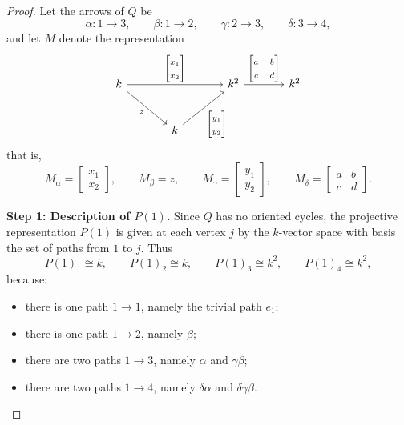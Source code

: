 \documentclass[11pt, a4paper]{article}
\begin{document}
\begin{enumerate}[leftmargin=*, label=\textbf{\arabic*.}]
\begin{proof}
    Let the arrows of \(Q\) be
    \[
    \alpha\colon 1\to 3,\qquad
    \beta\colon 1\to 2,\qquad
    \gamma\colon 2\to 3,\qquad
    \delta\colon 3\to 4,
    \]
    and let \(M\) denote the representation
    \[
    \begin{tikzcd}[ampersand replacement=\&, column sep=large, row sep=large]
    k \arrow[rr, "{\begin{bmatrix}x_1\\x_2\end{bmatrix}}"] \arrow[dr, "z"'] \& \& k^2 \arrow[r, "{\begin{bmatrix}a&b\\ c&d\end{bmatrix}}"] \& k^2 \\
    \& k \arrow[ur, "{\begin{bmatrix}y_1\\y_2\end{bmatrix}}"'] \&
    \end{tikzcd}
    \]
    that is,
    \[
    M_\alpha=\begin{bmatrix}x_1\\x_2\end{bmatrix},\qquad
    M_\beta=z,\qquad
    M_\gamma=\begin{bmatrix}y_1\\y_2\end{bmatrix},\qquad
    M_\delta=\begin{bmatrix}a&b\\c&d\end{bmatrix}.
    \]
    
    \medskip
    \noindent\textbf{Step 1: Description of \(P(1)\).}
    Since \(Q\) has no oriented cycles, the projective representation \(P(1)\) is given at each vertex \(j\) by the \(k\)-vector space with basis the set of paths from \(1\) to \(j\). Thus
    \[
    P(1)_1 \cong k,\qquad
    P(1)_2 \cong k,\qquad
    P(1)_3 \cong k^2,\qquad
    P(1)_4 \cong k^2,
    \]
    because:
    \begin{itemize}
        \item there is one path \(1\to 1\), namely the trivial path \(e_1\);
        \item there is one path \(1\to 2\), namely \(\beta\);
        \item there are two paths \(1\to 3\), namely \(\alpha\) and \(\gamma\beta\);
        \item there are two paths \(1\to 4\), namely \(\delta\alpha\) and \(\delta\gamma\beta\).
    \end{itemize}
    

\end{proof}
\end{enumerate}
\end{document}
